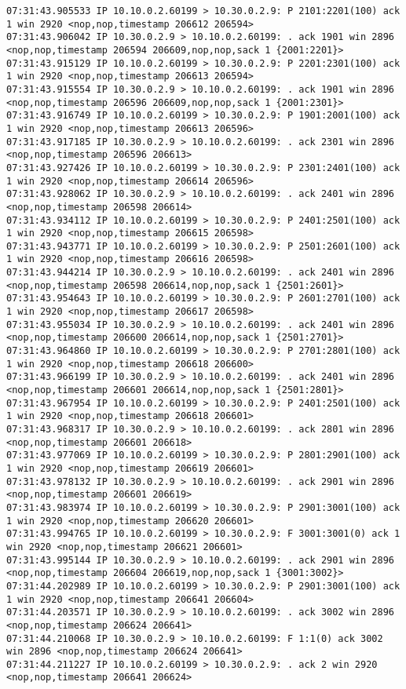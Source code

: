 \documentclass[a4paper,12pt]{article}
\begin{document}
\begin{Verbatim}
07:31:43.905533 IP 10.10.0.2.60199 > 10.30.0.2.9: P 2101:2201(100) ack 1 win 2920 <nop,nop,timestamp 206612 206594>
07:31:43.906042 IP 10.30.0.2.9 > 10.10.0.2.60199: . ack 1901 win 2896 <nop,nop,timestamp 206594 206609,nop,nop,sack 1 {2001:2201}>
07:31:43.915129 IP 10.10.0.2.60199 > 10.30.0.2.9: P 2201:2301(100) ack 1 win 2920 <nop,nop,timestamp 206613 206594>
07:31:43.915554 IP 10.30.0.2.9 > 10.10.0.2.60199: . ack 1901 win 2896 <nop,nop,timestamp 206596 206609,nop,nop,sack 1 {2001:2301}>
07:31:43.916749 IP 10.10.0.2.60199 > 10.30.0.2.9: P 1901:2001(100) ack 1 win 2920 <nop,nop,timestamp 206613 206596>
07:31:43.917185 IP 10.30.0.2.9 > 10.10.0.2.60199: . ack 2301 win 2896 <nop,nop,timestamp 206596 206613>
07:31:43.927426 IP 10.10.0.2.60199 > 10.30.0.2.9: P 2301:2401(100) ack 1 win 2920 <nop,nop,timestamp 206614 206596>
07:31:43.928062 IP 10.30.0.2.9 > 10.10.0.2.60199: . ack 2401 win 2896 <nop,nop,timestamp 206598 206614>
07:31:43.934112 IP 10.10.0.2.60199 > 10.30.0.2.9: P 2401:2501(100) ack 1 win 2920 <nop,nop,timestamp 206615 206598>
07:31:43.943771 IP 10.10.0.2.60199 > 10.30.0.2.9: P 2501:2601(100) ack 1 win 2920 <nop,nop,timestamp 206616 206598>
07:31:43.944214 IP 10.30.0.2.9 > 10.10.0.2.60199: . ack 2401 win 2896 <nop,nop,timestamp 206598 206614,nop,nop,sack 1 {2501:2601}>
07:31:43.954643 IP 10.10.0.2.60199 > 10.30.0.2.9: P 2601:2701(100) ack 1 win 2920 <nop,nop,timestamp 206617 206598>
07:31:43.955034 IP 10.30.0.2.9 > 10.10.0.2.60199: . ack 2401 win 2896 <nop,nop,timestamp 206600 206614,nop,nop,sack 1 {2501:2701}>
07:31:43.964860 IP 10.10.0.2.60199 > 10.30.0.2.9: P 2701:2801(100) ack 1 win 2920 <nop,nop,timestamp 206618 206600>
07:31:43.966199 IP 10.30.0.2.9 > 10.10.0.2.60199: . ack 2401 win 2896 <nop,nop,timestamp 206601 206614,nop,nop,sack 1 {2501:2801}>
07:31:43.967954 IP 10.10.0.2.60199 > 10.30.0.2.9: P 2401:2501(100) ack 1 win 2920 <nop,nop,timestamp 206618 206601>
07:31:43.968317 IP 10.30.0.2.9 > 10.10.0.2.60199: . ack 2801 win 2896 <nop,nop,timestamp 206601 206618>
07:31:43.977069 IP 10.10.0.2.60199 > 10.30.0.2.9: P 2801:2901(100) ack 1 win 2920 <nop,nop,timestamp 206619 206601>
07:31:43.978132 IP 10.30.0.2.9 > 10.10.0.2.60199: . ack 2901 win 2896 <nop,nop,timestamp 206601 206619>
07:31:43.983974 IP 10.10.0.2.60199 > 10.30.0.2.9: P 2901:3001(100) ack 1 win 2920 <nop,nop,timestamp 206620 206601>
07:31:43.994765 IP 10.10.0.2.60199 > 10.30.0.2.9: F 3001:3001(0) ack 1 win 2920 <nop,nop,timestamp 206621 206601>
07:31:43.995144 IP 10.30.0.2.9 > 10.10.0.2.60199: . ack 2901 win 2896 <nop,nop,timestamp 206604 206619,nop,nop,sack 1 {3001:3002}>
07:31:44.202989 IP 10.10.0.2.60199 > 10.30.0.2.9: P 2901:3001(100) ack 1 win 2920 <nop,nop,timestamp 206641 206604>
07:31:44.203571 IP 10.30.0.2.9 > 10.10.0.2.60199: . ack 3002 win 2896 <nop,nop,timestamp 206624 206641>
07:31:44.210068 IP 10.30.0.2.9 > 10.10.0.2.60199: F 1:1(0) ack 3002 win 2896 <nop,nop,timestamp 206624 206641>
07:31:44.211227 IP 10.10.0.2.60199 > 10.30.0.2.9: . ack 2 win 2920 <nop,nop,timestamp 206641 206624>
\end{Verbatim}
\end{document}
